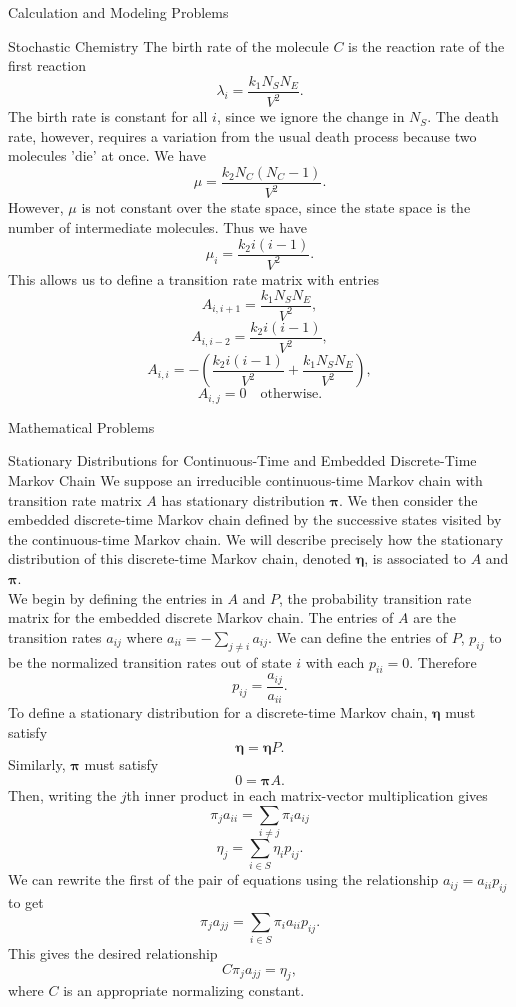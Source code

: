 \documentclass[12pt]{article}
\numberwithin{equation}{section}
\begin{document}
\begin{section}{Calculation and Modeling Problems}
\begin{subsection}{Stochastic Chemistry}
        The birth rate of the molecule $C$ is the reaction rate of the first reaction
        $$\lambda_i=\frac{k_1 N_SN_E}{V^2}.$$
        The birth rate is constant for all $i$, since we ignore the change in $N_S$. The death rate, however, requires a variation from the usual death process because two molecules 'die' at once. We have
        $$\mu=\frac{k_2N_C(N_C-1)}{V^2}.$$
        However, $\mu$ is not constant over the state space, since the state space is the number of intermediate molecules. Thus we have
        $$\mu_i=\frac{k_2 i(i-1)}{V^2}.$$
        This allows us to define a transition rate matrix with entries
        $$A_{i,i+1}=\frac{k_1 N_SN_E}{V^2},$$
        $$A_{i,i-2}=\frac{k_2 i(i-1)}{V^2},$$
        $$A_{i,i}=-\left(\frac{k_2 i(i-1)}{V^2}+\frac{k_1 N_SN_E}{V^2}\right),$$
        $$A_{i,j}=0\quad \text{otherwise}.$$

        \end{subsection}
    \end{section}
    \begin{section}{Mathematical Problems}
    \begin{subsection}{Stationary Distributions for Continuous-Time and Embedded Discrete-Time Markov Chain}
    We suppose an irreducible continuous-time Markov chain with transition rate matrix $A$ has stationary distribution $\mathbf{\pi}$. We then consider the embedded discrete-time Markov chain defined by the successive states visited by the continuous-time Markov chain. We will describe precisely how the stationary distribution of this discrete-time Markov chain, denoted $\mathbf{\eta}$, is associated to $A$ and $\mathbf{\pi}$.\\

    We begin by defining the entries in $A$ and $P$, the probability transition rate matrix for the embedded discrete Markov chain. The entries of $A$ are the transition rates $a_{ij}$ where $a_{ii}=-\sum_{j\neq i}a_{ij}$. We can define the entries of $P$, $p_{ij}$ to be the normalized transition rates out of state $i$ with each $p_{ii}=0$. Therefore
    $$p_{ij}=\frac{a_{ij}}{a_{ii}}.$$
    To define a stationary distribution for a discrete-time Markov chain, $\mathbf{\eta}$ must satisfy
    $$\mathbf{\eta}=\mathbf{\eta}P.$$
    Similarly, $\mathbf{\pi}$ must satisfy
    $$0=\mathbf{\pi}A.$$
    Then, writing the $j$th inner product in each matrix-vector multiplication gives
    $$\pi_ja_{ii}=\sum_{i\neq j}\pi_i a_{ij}$$
    $$\eta_j=\sum_{i\in S}\eta_ip_{ij}.$$
    We can rewrite the first of the pair of equations using the relationship $a_{ij}=a_{ii}p_{ij}$ to get
    $$\pi_ja_{jj}=\sum_{i\in S}\pi_ia_{ii}p_{ij}.$$
    This gives the desired relationship
    $$C\pi_ja_{jj}=\eta_j,$$
    where $C$ is an appropriate normalizing constant.
    
    
    \end{subsection}
\end{section}
\end{document}
